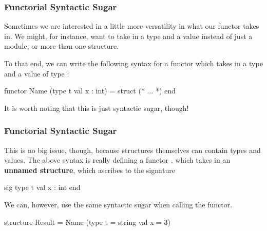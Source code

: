 \documentclass[aspectratio=169]{beamer}
\begin{document}
\begin{frame}[fragile]
  \frametitle{Functorial Syntactic Sugar}

  Sometimes we are interested in a little more versatility in what our functor
  takes in. We might, for instance, want to take in a type and a value instead of
  just a module, or more than one structure.

  \pause
  \vspace{\fill}

  To that end, we can write the following syntax for a functor which takes in
  a type  and a value  of type :

  \begin{codeblock}
    functor Name (type t
                  val x : int) =
      struct
        (* ... *)
      end
  \end{codeblock}

  \pause
  \vspace{\fill}


  \pause
  \vspace{\fill}

  It is worth noting that this is just syntactic sugar, though!
\end{frame}

\begin{frame}[fragile]
  \frametitle{Functorial Syntactic Sugar}


  \pause
  \vspace{\fill}

  This is no big issue, though, because structures themselves can contain types
  and values. The above syntax is really defining a functor , which
  takes in an \textbf{unnamed structure}, which ascribes to the signature

  \begin{codeblock}
    sig
      type t
      val x : int
    end
  \end{codeblock}

  \pause
  \vspace{\fill}

  We can, however, use the same syntactic sugar when calling the functor.

  \vspace{\fill}

  \begin{codeblock}
    structure Result = Name (type t = string
                             val x = 3)
  \end{codeblock}
\end{frame}
\end{document}
